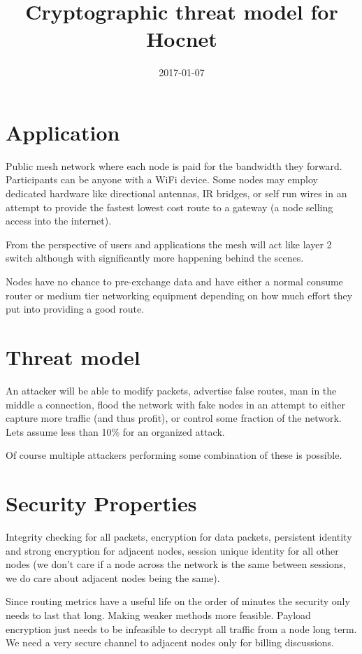 \documentclass[11pt]{article}
\title{\textbf{Cryptographic threat model for Hocnet}}
\date{2017-01-07}
\begin{document}
\maketitle

\section{Application}

Public mesh network where each node is paid for the bandwidth they forward. Participants can be anyone with a WiFi device. Some nodes may employ dedicated hardware like directional antennas, IR bridges, or self run wires in an attempt to provide the fastest lowest cost route to a gateway (a node selling access into the internet). 

From the perspective of users and applications the mesh will act like layer 2 switch although with significantly more happening behind the scenes. 

Nodes have no chance to pre-exchange data and have either a normal consume router or medium tier networking equipment depending on how much effort they put into providing a good route.

\section{Threat model}

An attacker will be able to modify packets, advertise false routes, man in the middle a connection, flood the network with fake nodes in an attempt to either capture more traffic (and thus profit), or control some fraction of the network. Lets assume less than 10\% for an organized attack.

Of course multiple attackers performing some combination of these is possible.  

\section{Security Properties}

Integrity checking for all packets, encryption for data packets, persistent identity and strong encryption for adjacent nodes, session unique identity for all other nodes (we don't care if a node across the network is the same between sessions, we do care about adjacent nodes being the same). 

Since routing metrics have a useful life on the order of minutes the security only needs to last that long. Making weaker methods more feasible. Payload encryption just needs to be infeasible to decrypt all traffic from a node long term. We need a very secure channel to adjacent nodes only for billing discussions. 
\end{document}
